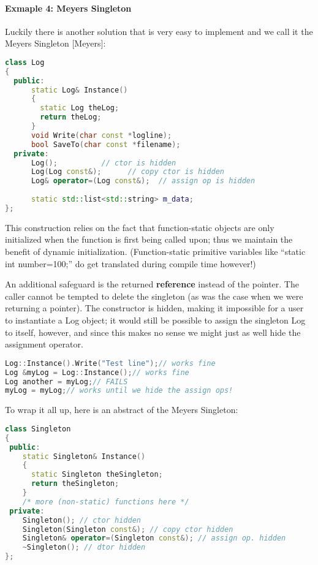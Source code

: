 \documentclass{book}
\begin{document}
\paragraph{Exmaple 4: Meyers Singleton}

Luckily there is another solution that is very easy to implement and we call it the Meyers Singleton [Meyers]:
\begin{lstlisting}[caption={sample code 4: Meyers Singleton},language=C++]
class Log 
{
  public:
      static Log& Instance()
      {
        static Log theLog;
        return theLog;
      }
      void Write(char const *logline);
      bool SaveTo(char const *filename);
  private:
      Log();          // ctor is hidden
      Log(Log const&);      // copy ctor is hidden
      Log& operator=(Log const&);  // assign op is hidden
    
      static std::list<std::string> m_data;
};
\end{lstlisting}

This construction relies on the fact that function-static objects are only initialized when the function is first being called upon;
thus we maintain the benefit of dynamic initialization. (Function-static primitive variables like ``static int number=100;'' do get translated during compile time however!)

An additional safeguard is the returned \textbf{reference} instead of the pointer.
The caller cannot be tempted to delete the singleton (as was the case when we were returning a pointer).
The constructor is hidden, making it impossible for a user to instantiate a Log object; 
it would still be possible to assign the singleton Log to itself, however, and since this makes no sense we might just as well hide the assignment operator.

\begin{lstlisting}[caption={sample code 4: usage of Meyers Singleton},language=C++]
Log::Instance().Write("Test line");// works fine
Log &myLog = Log::Instance();// works fine
Log another = myLog;// FAILS
myLog = myLog;// works until we hide the assign ops!
\end{lstlisting}

To wrap it all up, here is an abstract of the Meyers Singleton:

\begin{lstlisting}[caption={sample code 4: abstract of Meyers Singleton},language=C++]
class Singleton 
{
 public:
    static Singleton& Instance() 
    {
      static Singleton theSingleton;
      return theSingleton;
    }
    /* more (non-static) functions here */
 private:
    Singleton(); // ctor hidden
    Singleton(Singleton const&); // copy ctor hidden
    Singleton& operator=(Singleton const&); // assign op. hidden
    ~Singleton(); // dtor hidden
};
\end{lstlisting}
\end{document}
